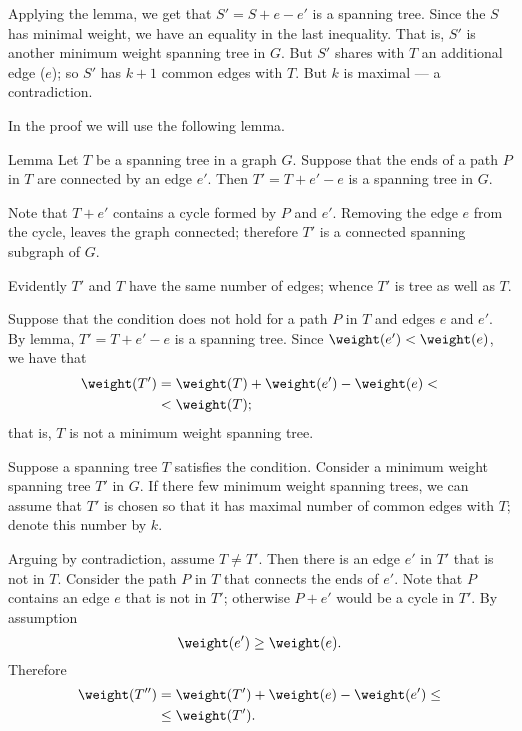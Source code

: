 Applying the lemma, we get that $S'=S+e-e'$ is a spanning tree.
Since the $S$ has minimal weight, we have an equality in the last inequality.
That is, $S'$ is another minimum weight spanning tree in $G$.
But $S'$ shares with $T$ an additional edge ($e$);
so $S'$ has $k+1$ common edges with $T$.
But $k$ is maximal --- a contradiction.
\qeds
\qeds

In the proof we will use the following lemma.

\begin{thm}{Lemma}
Let $T$ be a spanning tree in a graph $G$.
Suppose that the ends of a path $P$ in $T$ are connected by an edge $e'$.
Then $T'=T+e'-e$ is a spanning tree in $G$.
\end{thm}

Note that $T+e'$ contains a cycle formed by $P$ and $e'$.
Removing the edge $e$ from the cycle, leaves the graph connected;
therefore $T'$ is a connected spanning subgraph of $G$.

Evidently $T'$ and $T$ have the same number of edges; whence $T'$ is tree as well as $T$.
\qeds


Suppose that the condition does not hold for a path $P$ in $T$ and edges $e$ and $e'$.
By lemma, $T'=T+e'-e$ is a spanning tree.
Since $\weight(e')<\weight(e)$, we have that
\begin{align*}
\weight(T')&=\weight(T)+\weight(e')-\weight(e)<
\\
&<\weight(T);
\end{align*}
that is, $T$ is not a minimum weight spanning tree.

Suppose a spanning tree $T$ satisfies the condition.
Consider a minimum weight spanning tree $T'$ in $G$.
If there few minimum weight spanning trees, we can assume that $T'$ is chosen so that it has maximal number of common edges with $T$; denote this number by $k$.

Arguing by contradiction, assume $T\ne T'$.
Then there is an edge $e'$ in $T'$ that is not in $T$.
Consider the path $P$ in $T$ that connects the ends of $e'$.
Note that $P$ contains an edge $e$ that is not in $T'$;
otherwise $P+e'$ would be a cycle in $T'$. 
By assumption 
\[\weight(e')\ge \weight(e).\]
Therefore 
\begin{align*}
\weight(T'')&=\weight(T')+\weight(e)-\weight(e')\le
\\
&\le\weight(T').
\end{align*}

